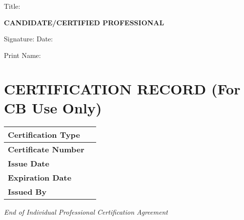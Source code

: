 \documentclass[11pt,a4paper]{article}
\begin{document}
Title: \underline{\hspace{6cm}}

\vspace{2em}

\textbf{CANDIDATE/CERTIFIED PROFESSIONAL}

\vspace{1.5em}

Signature: \underline{\hspace{6cm}} Date: \underline{\hspace{3cm}}

Print Name: \underline{\hspace{6cm}}

\vspace{2em}

\section*{CERTIFICATION RECORD (For CB Use Only)}

\begin{tabular}{|l|p{10cm}|}
\hline
\textbf{Certification Type} & \hspace{8cm} \\
\hline
\textbf{Certificate Number} & \\
\hline
\textbf{Issue Date} & \\
\hline
\textbf{Expiration Date} & \\
\hline
\textbf{Issued By} & \\
\hline
\end{tabular}

\vspace{2em}

\begin{center}
\textit{End of Individual Professional Certification Agreement}
\end{center}
\end{document}
